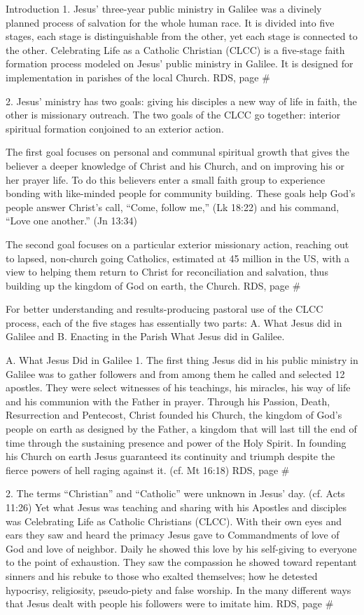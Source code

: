 \documentclass[oneside]{book}
\begin{document}
Introduction
1. Jesus' three-year public ministry in Galilee was a divinely planned process
of salvation for the whole human race. It is divided into five stages, each
stage is distinguishable from the other, yet each stage is connected to the
other. Celebrating Life as a Catholic Christian (CLCC) is a five-stage faith
formation process modeled on Jesus' public ministry in Galilee. It is designed
for implementation in parishes of the local Church.
RDS, page \#

2. Jesus' ministry has two goals: giving his disciples a new way of life in
faith, the other is missionary outreach. The two goals of the CLCC go together:
interior spiritual formation conjoined to an exterior action.

The first goal focuses on personal and communal spiritual growth that gives the
believer a deeper knowledge of Christ and his Church, and on improving his or
her prayer life. To do this believers enter a small faith group to experience
bonding with like-minded people for community building. These goals help God's
people answer Christ's call, ``Come, follow me,'' (Lk 18:22) and his command,
``Love one another.'' (Jn 13:34)

The second goal focuses on a particular exterior missionary action, reaching out
to lapsed, non-church going Catholics, estimated at 45 million in the US, with a
view to helping them return to Christ for reconciliation and salvation, thus
building up the kingdom of God on earth, the Church.
RDS, page \#

For better understanding and results-producing pastoral use of the CLCC process,
each of the five stages has essentially two parts: A. What Jesus did in Galilee
and B. Enacting in the Parish What Jesus did in Galilee.

A. What Jesus Did in Galilee
1. The first thing Jesus did in his public ministry in Galilee was to gather
followers and from among them he called and selected 12 apostles. They were
select witnesses of his teachings, his miracles, his way of life and his
communion with the Father in prayer. Through his Passion, Death, Resurrection
and Pentecost, Christ founded his Church, the kingdom of God's people on earth
as designed by the Father, a kingdom that will last till the end of time through
the sustaining presence and power of the Holy Spirit. In founding his Church on
earth Jesus guaranteed its continuity and triumph despite the fierce powers of
hell raging against it. (cf. Mt 16:18)
RDS, page \#

2. The terms ``Christian'' and ``Catholic'' were unknown in Jesus'
day. (cf. Acts 11:26) Yet what Jesus was teaching and sharing with his Apostles
and disciples was Celebrating Life as Catholic Christians (CLCC). With their own
eyes and ears they saw and heard the primacy Jesus gave to Commandments of love
of God and love of neighbor. Daily he showed this love by his self-giving to
everyone to the point of exhaustion. They saw the compassion he showed toward
repentant sinners and his rebuke to those who exalted themselves; how he
detested hypocrisy, religiosity, pseudo-piety and false worship. In the many
different ways that Jesus dealt with people his followers were to imitate him.
RDS, page \#
\end{document}
